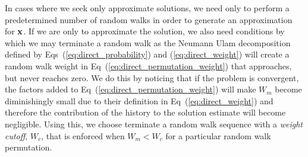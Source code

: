 In cases where we seek only approximate solutions, we need only to
perform a predetermined number of random walks in order to generate an
approximation for $\mathbf{x}$. If we are only to approximate the
solution, we also need conditions by which we may terminate a random
walk as the Neumann Ulam decomposition defined by
Eqs~(\ref{eq:direct_probability}) and (\ref{eq:direct_weight}) will
create a random walk weight in Eq~(\ref{eq:direct_permutation_weight})
that approaches, but never reaches zero. We do this by noticing that
if the problem is convergent, the factors added to
Eq~(\ref{eq:direct_permutation_weight}) will make $W_m$ become
diminishingly small due to their definition in
Eq~(\ref{eq:direct_weight}) and therefore the contribution of the
history to the solution estimate will become negligible. Using this,
we choose terminate a random walk sequence with a \textit{weight
  cutoff}, $W_c$, that is enforced when $W_m < W_c$ for a particular
random walk permutation.

